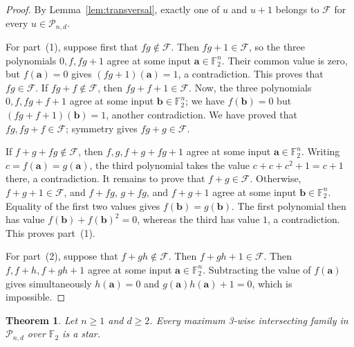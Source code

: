 \documentclass[12pt,reqno]{amsart}
\newtheorem{thm}{Theorem}[section]
\theoremstyle{definition}
\newcommand{\F}{\mathbb{F}}
\newcommand{\cF}{\mathcal F}
\newcommand{\cP}{\mathcal P}
\begin{document}
\begin{proof}
By Lemma~\ref{lem:transversal}, exactly one of $u$ and $u+1$ belongs
to $\cF$ for every $u\in\cP_{n,d}$.

For part~(1), suppose first that $fg\notin\cF$. Then $fg+1\in\cF$, so the three polynomials $0,f,fg+1$ agree at some input $\mathbf{a}\in\F_{2}^{n}$. Their common value is zero, but $f(\mathbf a)=0$
gives $(fg+1)(\mathbf a)=1$, a contradiction. This proves that $fg\in\cF$. If $fg+f\notin\cF$, then $fg+f+1\in\cF$. Now, the three polynomials $0,f,fg+f+1$ agree at some input $\mathbf{b}\in\F_{2}^{n}$; we have $f(\mathbf b)=0$ but $(fg+f+1)(\mathbf b)=1$, another contradiction. We have proved that $fg,fg+f\in\cF$; symmetry gives $fg+g\in\cF$.

If $f+g+fg\notin\cF$, then $f,g,f+g+fg+1$ agree at some input $\mathbf{a}\in\F_{2}^{n}$. Writing $c=f(\mathbf a)=g(\mathbf a)$, the third polynomial takes the value $c+c+c^2+1=c+1$ there, a contradiction. It remains to prove that $f+g\in\cF$. Otherwise, $f+g+1\in\cF$, and $f+fg$, $g+fg$, and $f+g+1$ agree at some input $\mathbf{b}\in\F_{2}^{n}$. Equality of the first two values gives $f(\mathbf b)=g(\mathbf b)$. The first polynomial then has value $f(\mathbf b)+f(\mathbf b)^2=0$, whereas the third has value $1$, a contradiction. This proves part~(1).

For part~(2), suppose that $f+gh\notin\cF$. Then $f+gh+1\in\cF$. Then $f,f+h,f+gh+1$ agree at some input $\mathbf{a}\in\F_{2}^{n}$. Subtracting the value of $f(\mathbf{a})$ gives simultaneously $h(\mathbf{a})=0$ and $g(\mathbf{a})h(\mathbf{a})+1=0$, which is impossible.
\end{proof}

\begin{thm}\label{thm:threewise-F2}
Let $n\geq 1$ and $d\geq2$. Every maximum 3-wise intersecting family
in $\cP_{n,d}$ over $\F_2$ is a star.
\end{thm}
\end{document}
